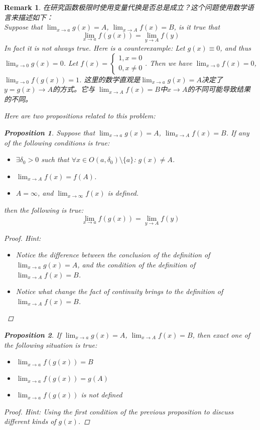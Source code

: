 \documentclass[onecolumn]{ctexart}
\newtheorem{proposition}{Proposition}
\newtheorem{remark}{Remark}
\begin{document}
\begin{remark}
  在研究函数极限时使用变量代换是否总是成立？这个问题使用数学语言来描述如下：\\
  Suppose that $\lim_{x \to a} g(x) = A$, $\lim_{x \to A} f(x) = B$, is it true that 
  \[
    \lim_{x \to a} f(g(x)) = \lim_{y \to A} f(y)
  \]
  In fact it is not always true. Here is a counterexample: Let $g(x) \equiv 0$, 
  and thus $\lim_{x \to 0} g(x) = 0$. Let $f(x) = 
  \begin{cases}
    1, x = 0 \\
    0, x \neq 0
  \end{cases}$. Then we have $\lim_{x \to 0} f(x) = 0$, $\lim_{x \to 0} f(g(x)) 
  = 1$. 这里的数学直观是$\lim_{x \to a} g(x) = A$决定了$y = g(x) \to A$的方式。它与
  $\lim_{x \to A} f(x) = B$中$x \to A$的不同可能导致结果的不同。

  Here are two propositions related to this problem:
  \begin{proposition}
    Suppose that $\lim_{x \to a} g(x) = A$, $\lim_{x \to A} f(x) = B$. If any of 
    the following conditions is true:
    \begin{itemize}
      \item $\exists \delta_0 > 0$ such that $\forall x \in O(a, \delta_0) 
      \setminus \{a\}$: $g(x) \neq A$.
      \item $\lim_{x \to A} f(x) = f(A)$.
      \item $A = \infty$, and $\lim_{x \to \infty} f(x)$ is defined.
    \end{itemize}
    then the following is true:
    \[
      \lim_{x \to a} f(g(x)) = \lim_{y \to A} f(y)
    \]
  \end{proposition}
  \begin{proof}
    Hint:
    \begin{itemize}
      \item Notice the difference between the conclusion of the definition of 
      $\lim_{x \to a} g(x) = A$, and the condition of the definition of 
      $\lim_{x \to A} f(x) = B$.
      \item Notice what change the fact of continuity brings to the definition 
      of $\lim_{x \to A} f(x) = B$.
    \end{itemize}
  \end{proof}

  \begin{proposition}
    If $\lim_{x \to a} g(x) = A$, $\lim_{x \to A} f(x) = B$, then exact one of 
    the following situation is true:
    \begin{itemize}
      \item $\lim_{x \to a} f(g(x)) = B$
      \item $\lim_{x \to a} f(g(x)) = g(A)$
      \item $\lim_{x \to a} f(g(x))$ is not defined
    \end{itemize}
  \end{proposition}
  \begin{proof}
    Hint: Using the first condition of the previous proposition to discuss 
    different kinds of $g(x)$.
  \end{proof}
\end{remark}
\end{document}
